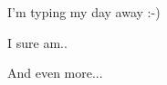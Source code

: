 \documentclass{article}
\begin{document}
I'm typing my day away :-)

I sure am..

And even more...
\end{document}
